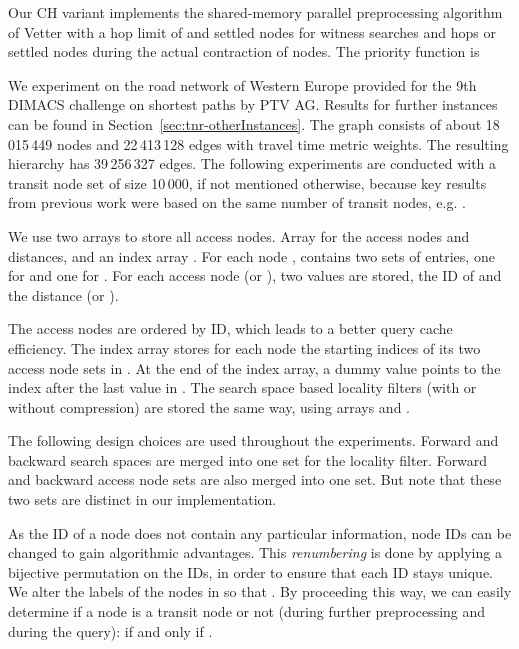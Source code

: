 \documentclass{llncs}
\begin{document}
Our CH variant implements the shared-memory parallel preprocessing algorithm of Vetter \cite{v-ptdch-09} with a hop limit of  and  settled nodes for witness searches and  hops or  settled nodes during the actual contraction of nodes.
The priority function is 

We experiment on the road network of Western Europe provided for the 9th DIMACS challenge on shortest paths \cite{dgj-spndi-09} by PTV AG.
Results for further instances can be found in Section~\ref{sec:tnr-otherInstances}.
The graph consists of about 18\,015\,449 nodes and 22\,413\,128 edges with travel time metric weights. The resulting hierarchy has 39\,256\,327 edges.
The following experiments are conducted with a transit node set of size 10\,000, if not mentioned otherwise, because key results from previous work were based on the same number of transit nodes, e.g. \cite{bfmss-itcsp-07}.

We use two arrays to store all access nodes.
Array  for the access nodes and distances, and an index array . 
For each node ,  contains two sets of entries, one for  and one for . For each access node  (or ), two values are stored, the ID of  and the distance  (or ).

The access nodes are ordered by ID, which leads to a better query cache efficiency.
The index array  stores for each node the starting indices of its two access node sets in .
At the end of the index array, a dummy value points to the index after the last value in .
The search space based locality filters (with or without compression) are stored the same way, using arrays  and .

The following design choices are used throughout the experiments.
Forward and backward search spaces are merged into one set for the locality filter. 
Forward and backward access node sets are also merged into one set.
But note that these two sets are distinct in our implementation.

As the ID of a node does not contain any particular information, node IDs can be changed to gain algorithmic advantages. 
This \textit{renumbering} is done by applying a bijective permutation on the IDs, in order to ensure that each ID stays unique.
We alter the labels of the nodes in  so that .
By proceeding this way, we can easily determine if a node  is a transit node or not (during further preprocessing and during the query):  if and only if .
\end{document}
